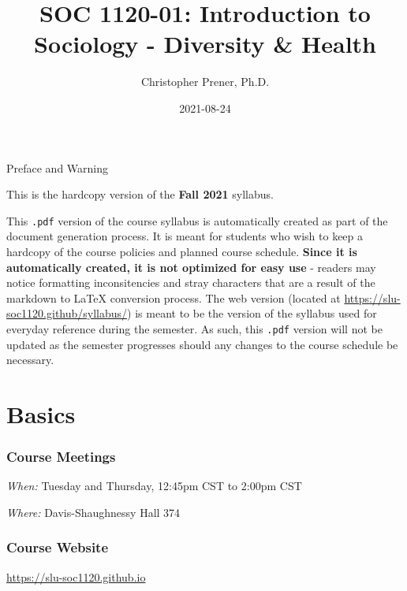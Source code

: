 \documentclass[
]{book}
\title{SOC 1120-01: Introduction to Sociology - Diversity \& Health}
\author{Christopher Prener, Ph.D.}
\date{2021-08-24}
\begin{document}
\maketitle

\begin{center}
{\huge Preface and Warning} \\
\end{center}
\vspace{5mm}
This is the hardcopy version of the \textbf{Fall 2021} syllabus.
\vspace{5mm}
\par \noindent This \texttt{.pdf} version of the course syllabus is automatically created as part of the document generation process. It is meant for students who wish to keep a hardcopy of the course policies and planned course schedule. \textbf{Since it is automatically created, it is not optimized for easy use} - readers may notice formatting inconsitencies and stray characters that are a result of the markdown to \LaTeX{} conversion process. The web version (located at \href{https://slu-soc1120.github/syllabus/}{https://slu-soc1120.github/syllabus/}) is meant to be the version of the syllabus used for everyday reference during the semester. As such, this \texttt{.pdf} version will not be updated as the semester progresses should any changes to the course schedule be necessary.

\hypertarget{basics}{%
\chapter*{Basics}\label{basics}}

\hypertarget{course-meetings}{%
\subsection*{Course Meetings}\label{course-meetings}}

\emph{When:} Tuesday and Thursday, 12:45pm CST to 2:00pm CST

\emph{Where:} Davis-Shaughnessy Hall 374

\hypertarget{course-website}{%
\subsection*{Course Website}\label{course-website}}

\url{https://slu-soc1120.github.io}
\end{document}
